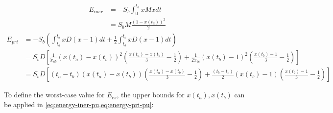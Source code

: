 \documentclass[utf8]{frontiersSCNS} %
\begin{document}
\begin{equation}\label{eq:energy-iner-pu}
    \begin{split}
        E_{iner} &= - S_b \int_{0}^{t_a} x M \dot{x} dt \\
        & = S_b M \frac{\left( 1 - x(t_a) \right)^{2}}{2}
    \end{split}
\end{equation}
\begin{equation}\label{eq:energy-pri-pu}
    \begin{split}
        E_{pri} &= - S_b \left( \int_{t_a}^{t_b} x D (x - 1) dt  + \frac{1}{2} \int_{t_b}^{t_c} x D (x - 1) dt \right) \\
         	  &= S_b D \left[ \frac{1}{\dot{x}_{ab}} \left( x(t_a) - x(t_b) \right)^2 \left( \frac{x(t_a) - x(t_b)}{3} - \frac{1}{2} \right) + \frac{1}{2 \dot{x}_{bc}} \left( x(t_b) - 1 \right)^2 \left( \frac{x(t_b) - 1}{3} - \frac{1}{2}\right) \right]  \\ 
         	  &= S_b D \left[  \left( t_a - t_b \right) \left( x(t_a) - x(t_b) \right) \left( \frac{x(t_a) - x(t_b)}{3} - \frac{1}{2} \right) + \frac{\left(t_b - t_c \right)}{2}  \left( x(t_b) - 1 \right) \left( \frac{x(t_b) - 1}{3} - \frac{1}{2}\right) \right]    
    \end{split}
\end{equation}

To define the worst-case value for $E_{es}$, the upper bounds for $x(t_a), x(t_b)$ can be applied in \cref{eq:energy-iner-pu,eq:energy-pri-pu}:
\end{document}
